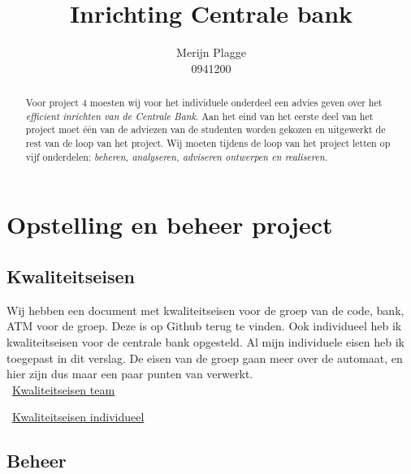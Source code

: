\documentclass{article}
\begin{document}
\title{\huge{Inrichting Centrale bank} }
\author{Merijn Plagge \\ 0941200}

\maketitle

\begin{abstract}

Voor project 4 moesten wij voor het individuele onderdeel een advies geven over het \emph{efficient inrichten van de Centrale Bank}.
Aan het eind van het eerste deel van het project moet \'e\'en van de adviezen van de studenten worden gekozen en uitgewerkt de rest van de loop van het project.
Wij moeten tijdens de loop van het project letten op vijf onderdelen: \emph{beheren, analyseren, adviseren ontwerpen en realiseren.}

\end{abstract}

\newpage

\tableofcontents

\newpage

\section{Opstelling en beheer project}

\subsection{Kwaliteitseisen}

Wij hebben een document met kwaliteitseisen voor de groep van de code, bank, ATM voor de groep.
Deze is op Github terug te vinden.
Ook individueel heb ik kwaliteitseisen voor de centrale bank opgesteld.
Al mijn individuele eisen heb ik toegepast in dit verslag.
De eisen van de groep gaan meer over de automaat, en hier zijn dus maar een paar punten van verwerkt. \\

\vspace{1mm}
\Mundus~\href{https://github.com/Gewad/Project4Bankalicious/blob/test/eisenlijstje.pdf}{Kwaliteitseisen team}

\Mundus~\href{https://github.com/Gewad/Project4Bankalicious/blob/merijn-branch/opdrachten/kwaliteitseisen/merijn/*.pdf}{Kwaliteitseisen individueel}

\subsection{Beheer}
\end{document}
